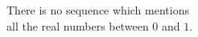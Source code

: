 \documentclass{article}
\begin{document}
\begin{preview}

There is no sequence which mentions \\
\null\quad all the real numbers between $0$ and $1$.

\end{preview}
\end{document}
